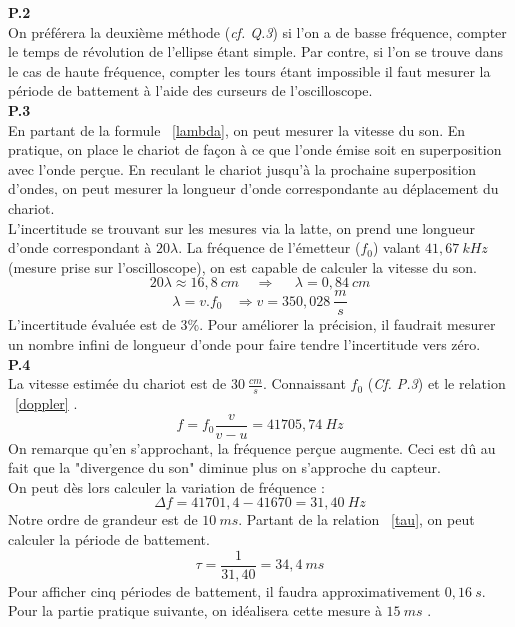\documentclass[british,french,11pt, a4paper, openany]{book}
\begin{document}
		\textbf{P.2}\\
		On préférera la deuxième méthode (\textit{cf. Q.3})  si l'on a de basse fréquence, compter le temps de révolution de l'ellipse étant simple. Par contre, si l'on se trouve dans le cas de haute fréquence, compter les tours étant impossible il faut mesurer la période de battement à l'aide des curseurs de l'oscilloscope.\\
		
		\textbf{P.3}\\
		En partant de la formule ~\eqref{lambda}, on peut mesurer la vitesse du son. En pratique, on place le chariot de façon à ce que l'onde émise soit en superposition avec l'onde perçue. En reculant le chariot jusqu'à la prochaine superposition d'ondes, on peut mesurer la longueur d'onde correspondante au déplacement du chariot.\\
		
		L'incertitude se trouvant sur les mesures via la latte, on prend une longueur d'onde correspondant à $20\lambda$. La fréquence de l'émetteur ($f_0$) valant $41,67\ kHz$ (mesure prise sur l'oscilloscope), on est capable de calculer la vitesse du son.
		\begin{equation}
			20\lambda \approx 16,8\ cm\ \ \ \ \ \Rightarrow\ \ \ \ \ \ \lambda = 0,84\ cm
		\end{equation}
		\begin{equation}
			\lambda = v.f_0\ \ \ \ \Rightarrow v = 350,028\ \frac{m}{s}
		\end{equation}
		L'incertitude évaluée est de $3\%$. Pour améliorer la précision, il faudrait mesurer un nombre infini de longueur d'onde pour faire tendre l'incertitude vers zéro.\\
		
		\textbf{P.4}\\
		La vitesse estimée du chariot est de $30\ \frac{cm}{s}$. Connaissant $f_0$ (\textit{Cf. P.3}) et le relation ~\eqref{doppler} .
		\begin{equation}
			f = f_0 \frac{v}{v - u} = 41705,74\ Hz
		\end{equation} 
		On remarque qu'en s'approchant, la fréquence perçue augmente. Ceci est dû au fait que la "divergence du son" diminue plus on s'approche du capteur.\\
		On peut dès lors calculer la variation de fréquence :
		\begin{equation}
			\Delta f =  41701,4 - 41670 = 31,40\ Hz
		\end{equation}
		Notre ordre de grandeur est de $10\ ms$. Partant de la relation ~\eqref{tau}, on peut calculer la période de battement.
		\begin{equation}
			\tau = \frac{1}{31,40} = 34,4\ ms
		\end{equation}
		Pour afficher cinq périodes de battement, il faudra approximativement $0,16\ s$. Pour la partie pratique suivante, on idéalisera cette mesure à $15\ ms$ .\\
		
\end{document}
